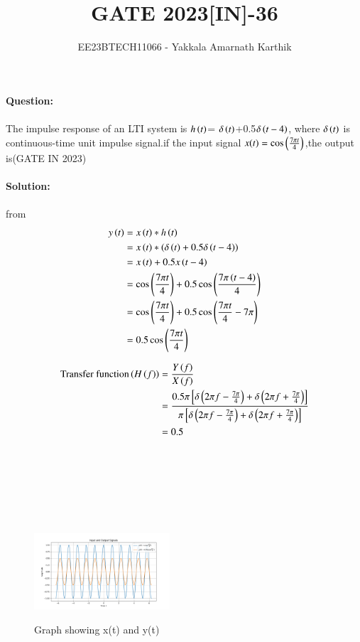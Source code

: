 \documentclass[journal,12pt,twocolumn]{IEEEtran}
\begin{document}


\title{GATE 2023[IN]-36}
\author{EE23BTECH11066 - Yakkala Amarnath Karthik}
\maketitle

\textbf{Question:}\\ \\
The impulse response of an LTI system is $h\left(t\right)$= $\delta\left(t\right)$+0.5$ \delta\left(t-4\right)$, where $\delta\left(t\right)$ is continuous-time unit impulse signal.if the input signal $x(t)=\cos\left(\frac{7\pi t}{4}\right)$,the output is\hfill(GATE IN 2023)\\ \\

\textbf{Solution:}\\
\\
 from 
\begin{align}
    y\left(t\right) &=x\left(t\right) * h\left(t\right)\\
            &=x\left(t\right) * \left(\delta\left(t\right)+0.5 \delta\left(t-4\right)\right)\\
            &=x\left(t\right)+0.5x\left(t-4\right)\\
            &=\cos\left(\frac{7\pi t}{4}\right)+0.5\cos\left(\frac{7\pi \left(t-4\right)}{4}\right)\\
            &=\cos\left(\frac{7\pi t}{4}\right)+0.5\cos\left(\frac{7\pi t}{4}-7\pi\right)\\
            &=0.5\cos\left(\frac{7\pi t}{4}\right)
\end{align}

\begin{align}
    \text{Transfer function}\left(H\left(f\right)\right)&=\frac{Y\left(f\right)}{X\left(f\right)}\\
    &=\frac{0.5\pi {}\left[\delta \left(2\pi f - \frac{7\pi}{4}\right)+ \delta \left(2\pi f + \frac{7\pi}{4}\right)\right]}{\pi {}\left[\delta \left(2\pi f - \frac{7\pi}{4}\right)+ \delta \left(2\pi f + \frac{7\pi}{4}\right)\right]}\\
    &=0.5
\end{align}

  \begin{figure}[ht]
        \hspace{3cm}\\ \\ \\ \\ \\ \\\includegraphics[width=0.45\textwidth]{figs/pythongate.png}
        \caption{Graph showing x(t) and y(t)}
    \end{figure} 
\end{document}
